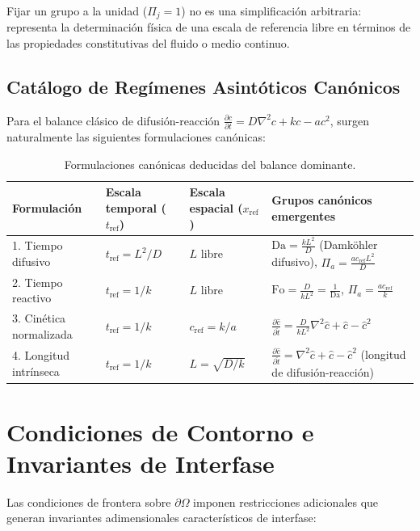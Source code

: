 \documentclass[11pt,a4paper]{article}
\begin{document}
Fijar un grupo a la unidad ($\Pi_j = 1$) no es una simplificación arbitraria: representa la determinación física de una escala de referencia libre en términos de las propiedades constitutivas del fluido o medio continuo.

\subsection{Catálogo de Regímenes Asintóticos Canónicos}
Para el balance clásico de difusión-reacción $\frac{\partial c}{\partial t} = D \nabla^2 c + k c - a c^2$, surgen naturalmente las siguientes formulaciones canónicas:

\begin{table}[h!]
\centering
\small
\begin{tabular}{@{}llll@{}}
\toprule
\textbf{Formulación} & \textbf{Escala temporal ($t_{\mathrm{ref}}$)} & \textbf{Escala espacial ($x_{\mathrm{ref}}$)} & \textbf{Grupos canónicos emergentes} \\
\midrule
1. Tiempo difusivo & $t_{\mathrm{ref}} = L^2/D$ & $L$ libre & $\mathrm{Da} = \frac{k L^2}{D}$ (Damköhler difusivo), $\Pi_a = \frac{a c_{\mathrm{ref}} L^2}{D}$ \\
2. Tiempo reactivo & $t_{\mathrm{ref}} = 1/k$ & $L$ libre & $\mathrm{Fo} = \frac{D}{k L^2} = \frac{1}{\mathrm{Da}}$, $\Pi_a = \frac{a c_{\mathrm{ref}}}{k}$ \\
3. Cinética normalizada & $t_{\mathrm{ref}} = 1/k$ & $c_{\mathrm{ref}} = k/a$ & $\frac{\partial \hat{c}}{\partial \hat{t}} = \frac{D}{k L^2} \nabla^2 \hat{c} + \hat{c} - \hat{c}^2$ \\
4. Longitud intrínseca & $t_{\mathrm{ref}} = 1/k$ & $L = \sqrt{D/k}$ & $\frac{\partial \hat{c}}{\partial \hat{t}} = \nabla^2 \hat{c} + \hat{c} - \hat{c}^2$ (longitud de difusión-reacción) \\
\bottomrule
\end{tabular}
\caption{Formulaciones canónicas deducidas del balance dominante.}
\label{tab:formulaciones}
\end{table}

\section{Condiciones de Contorno e Invariantes de Interfase}
Las condiciones de frontera sobre $\partial\Omega$ imponen restricciones adicionales que generan invariantes adimensionales característicos de interfase:
\end{document}
